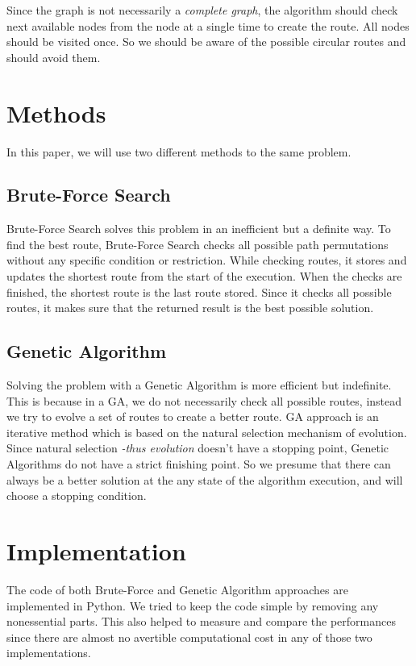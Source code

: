 \documentclass[journal,transmag]{IEEEtran}
\begin{document}
    Since the graph is not necessarily a \textit{complete graph}, the algorithm
    should check next available nodes from the node at a single time to create
    the route. All nodes should be visited once. So we should be aware of the
    possible circular routes and should avoid them.

    \section{Methods}

    In this paper, we will use two different methods to the same problem.

    \subsection{Brute-Force Search}

    Brute-Force Search solves this problem in an inefficient but a definite way.
    To find the best route, Brute-Force Search checks all possible path
    permutations without any specific condition or restriction. While checking
    routes, it stores and updates the shortest route from the start of the
    execution. When the checks are finished, the shortest route is the last
    route stored. Since it checks all possible routes, it makes sure that the
    returned result is the best possible solution.

    \subsection{Genetic Algorithm}

    Solving the problem with a Genetic Algorithm is more efficient but
    indefinite. This is because in a GA, we do not necessarily check all
    possible routes, instead we try to evolve a set of routes to create a better
    route. GA approach is an iterative method which is based on the natural
    selection mechanism of evolution. Since natural selection \textit{-thus
    evolution} doesn't have a stopping point, Genetic Algorithms do not have a
    strict finishing point. So we presume that there can always be a better
    solution at the any state of the algorithm execution, and will choose a
    stopping condition.


    \section{Implementation}

    The code \cite{code_repository} of both Brute-Force and Genetic Algorithm
    approaches are implemented in Python. We tried to keep the code simple by
    removing any nonessential parts. This also helped to measure and compare the
    performances since there are almost no avertible computational cost in any
    of those two implementations.
\end{document}
